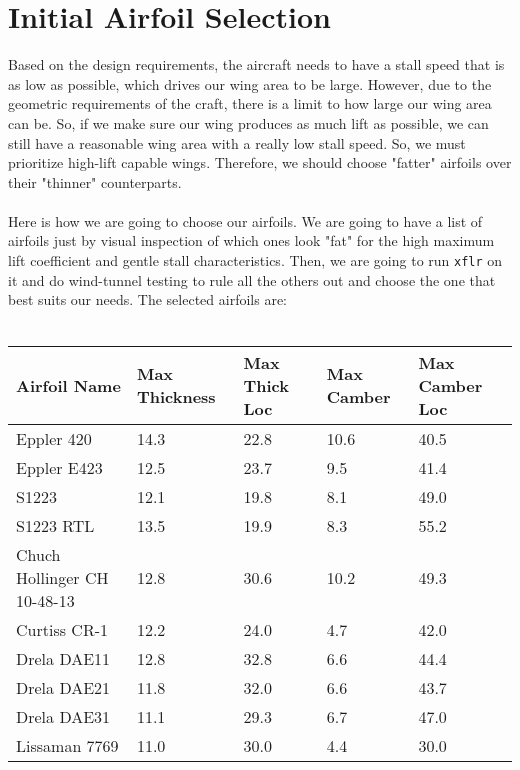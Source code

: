 \section{Initial Airfoil Selection}
\begin{comment}
\end{comment}
Based on the design requirements, the aircraft needs to have a stall speed that is as low as possible, which drives our wing area to be large.
However, due to the geometric requirements of the craft, there is a limit to how large our wing area can be.
So, if we make sure our wing produces as much lift as possible, we can still have a reasonable wing area with a really low stall speed. 
So, we must prioritize high-lift capable wings.
Therefore, we should choose "fatter" airfoils over their "thinner" counterparts.
\\~\\Here is how we are going to choose our airfoils. 
We are going to have a list of airfoils just by visual inspection of which ones look "fat" for the high maximum lift coefficient and gentle stall characteristics.
Then, we are going to run \texttt{xflr} on it and do wind-tunnel testing to rule all the others out and choose the one that best suits our needs.
The selected airfoils are:
\\~\\\begin{tabular}{|m{\ltabsize}|m{\tabsize}|m{\tabsize}|m{\tabsize}|m{\tabsize}|}
\hline 
Airfoil Name  & Max Thickness & Max Thick Loc & Max Camber & Max Camber Loc \\ \hline
Eppler 420      & 14.3 & 22.8 & 10.6 & 40.5 \\ \hline
Eppler E423     & 12.5 & 23.7 &  9.5 & 41.4 \\ \hline
S1223           & 12.1 & 19.8 &  8.1 & 49.0 \\ \hline
S1223 RTL       & 13.5 & 19.9 &  8.3 & 55.2 \\ \hline
Chuch Hollinger CH 10-48-13 & 12.8 & 30.6 & 10.2 & 49.3 \\ \hline
Curtiss CR-1    & 12.2 & 24.0 &  4.7 & 42.0 \\ \hline
Drela DAE11     & 12.8 & 32.8 &  6.6 & 44.4 \\ \hline
Drela DAE21     & 11.8 & 32.0 &  6.6 & 43.7 \\ \hline
Drela DAE31     & 11.1 & 29.3 &  6.7 & 47.0 \\ \hline
Lissaman 7769   & 11.0 & 30.0 &  4.4 & 30.0 \\ \hline
\end{tabular}
